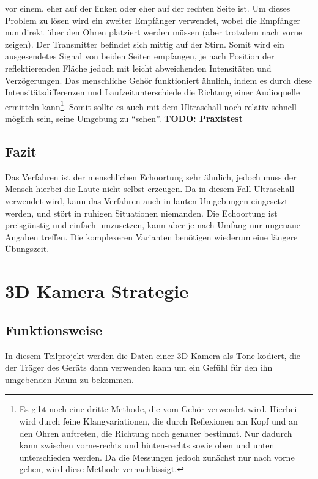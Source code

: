 \documentclass[a4paper,12pt,ngerman]{scrartcl}
\begin{document}
vor einem, eher auf der linken oder eher auf der rechten Seite ist. Um dieses Problem zu 
lösen wird ein zweiter Empfänger verwendet, wobei die Empfänger nun direkt über den Ohren 
platziert werden müssen (aber trotzdem nach vorne zeigen). Der Transmitter befindet sich 
mittig auf der Stirn. Somit wird ein ausgesendetes Signal von beiden Seiten empfangen, je 
nach Position der reflektierenden Fläche jedoch mit leicht abweichenden Intensitäten und 
Verzögerungen. Das menschliche Gehör funktioniert ähnlich, indem es durch diese 
Intensitätsdifferenzen und Laufzeitunterschiede die Richtung einer Audioquelle ermitteln 
kann\footnote{Es gibt noch eine dritte Methode, die vom Gehör verwendet wird. Hierbei wird 
durch feine Klangvariationen, die durch Reflexionen am Kopf und an den Ohren auftreten, die 
Richtung noch genauer bestimmt. Nur dadurch kann zwischen vorne-rechts und hinten-rechts 
sowie oben und unten unterschieden werden. Da die Messungen jedoch zunächst nur nach vorne 
gehen, wird diese Methode vernachlässigt.}. Somit sollte es auch mit dem Ultraschall noch 
relativ schnell möglich sein, seine Umgebung zu \enquote{sehen}. \textbf{TODO: Praxistest}

\subsection{Fazit}

Das Verfahren ist der menschlichen Echoortung sehr ähnlich, jedoch muss der Mensch hierbei 
die Laute nicht selbst erzeugen. Da in diesem Fall Ultraschall verwendet wird, kann das 
Verfahren auch in lauten Umgebungen eingesetzt werden, und stört in ruhigen Situationen 
niemanden. Die Echoortung ist preisgünstig und einfach umzusetzen, kann aber je nach 
Umfang nur ungenaue Angaben treffen. Die komplexeren Varianten benötigen wiederum eine 
längere Übungszeit.

\newpage

\section{3D Kamera Strategie}

\subsection{Funktionsweise}

In diesem Teilprojekt werden die Daten einer 3D-Kamera als Töne kodiert, die der Träger des Geräts
dann verwenden kann um ein Gefühl für den ihn umgebenden Raum zu bekommen. 
\end{document}
